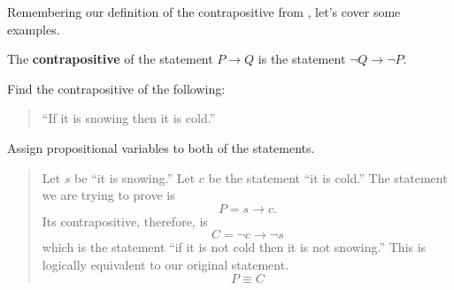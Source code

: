 Remembering our definition of the contrapositive from ,
let's cover some examples.

\begin{defn}
  The \textbf{contrapositive} of the statement $P \to Q$
  is the statement $\neg Q \to \neg P$.
  \label{defn:contrapositive}
\end{defn}

\begin{ex}
  Find the contrapositive of the following:
  \begin{quote}
    ``If it is snowing then it is cold.''
  \end{quote}
  \begin{sol}
    Assign propositional variables to both of the statements.
    \begin{quote}
      Let $s$ be ``it is snowing.'' Let $c$ be the statement ``it is cold.''
      The statement we are trying to prove is
      \[ P = s\to c.\]
      Its contrapositive, therefore, is
      \[ C = \neg c \to \neg s \]
      which is the statement ``if it is not cold then it is not snowing.''
      This is logically equivalent to our original statement.
      \[ P \equiv C \]
    \end{quote}
  \end{sol}
\end{ex}
